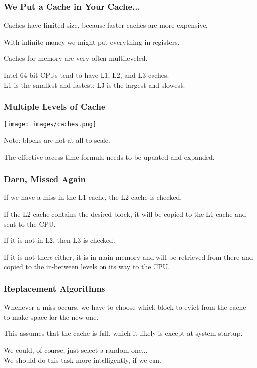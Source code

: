 \begin{frame}
\frametitle{We Put a Cache in Your Cache...}

Caches have limited size, because faster caches are more expensive. 

With infinite money we might put everything in registers.

Caches for memory are very often multileveled. 

Intel 64-bit CPUs tend to have L1, L2, and L3 caches.\\
\quad L1 is the smallest and fastest;  L3 is the largest and slowest.

\end{frame}

\begin{frame}
\frametitle{Multiple Levels of Cache}

\begin{center}
\texttt{[image: images/caches.png]}
\end{center}

Note: blocks are not at all to scale.

The effective access time formula needs to be updated and expanded.

\end{frame}

\begin{frame}
\frametitle{Darn, Missed Again}

If we have a miss in the L1 cache, the L2 cache is checked. 

If the L2 cache contains the desired block, it will be copied to the L1 cache and sent to the CPU. 

If it is not in L2, then L3 is checked. 

If it is not there either, it is in main memory and will be retrieved from there and copied to the in-between levels on its way to the CPU. 


\end{frame}

\begin{frame}
\frametitle{Replacement Algorithms}

Whenever a miss occurs, we have to choose which block to \alert{evict} from the cache to make space for the new one. 

This assumes that the cache is full, which it likely is except at system startup. 

We could, of course, just select a random one...\\
\quad We should do this task more intelligently, if we can.

\end{frame}


